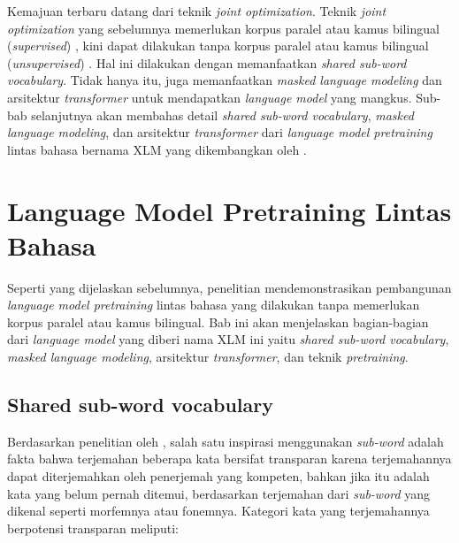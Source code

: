     Kemajuan terbaru datang dari teknik \textit{joint optimization}. Teknik \textit{joint optimization} yang sebelumnya memerlukan korpus paralel atau kamus bilingual (\textit{supervised}) \parencite{Xing_Wang_Liu_Lin}, kini dapat dilakukan tanpa korpus paralel atau kamus bilingual (\textit{unsupervised}) \parencite{LampleConneau2019}. Hal ini dilakukan dengan memanfaatkan \textit{shared sub-word vocabulary}. Tidak hanya itu, \parencite{LampleConneau2019} juga memanfaatkan \textit{masked language modeling} dan arsitektur \textit{transformer} untuk mendapatkan \textit{language model} yang mangkus. Sub-bab selanjutnya akan membahas detail \textit{shared sub-word vocabulary}, \textit{masked language modeling}, dan arsitektur \textit{transformer} dari \textit{language model pretraining} lintas bahasa bernama XLM yang dikembangkan oleh \parencite{LampleConneau2019}.

\section{Language Model Pretraining Lintas Bahasa}
    Seperti yang dijelaskan sebelumnya, penelitian \parencite{LampleConneau2019} mendemonstrasikan pembangunan \textit{language model pretraining} lintas bahasa yang dilakukan tanpa memerlukan korpus paralel atau kamus bilingual. Bab ini akan menjelaskan bagian-bagian dari \textit{language model} yang diberi nama XLM ini yaitu \textit{shared sub-word vocabulary}, \textit{masked language modeling}, arsitektur \textit{transformer}, dan teknik \textit{pretraining}.

    \subsection{Shared sub-word vocabulary}
    Berdasarkan penelitian oleh \parencite{Sennrich_Haddow_Birch_2016}, salah satu inspirasi menggunakan \textit{sub-word} adalah fakta bahwa terjemahan beberapa kata bersifat transparan karena terjemahannya dapat diterjemahkan oleh penerjemah yang kompeten, bahkan jika itu adalah kata yang belum pernah ditemui, berdasarkan terjemahan dari \textit{sub-word} yang dikenal seperti morfemnya atau fonemnya. Kategori kata yang terjemahannya berpotensi transparan meliputi:


